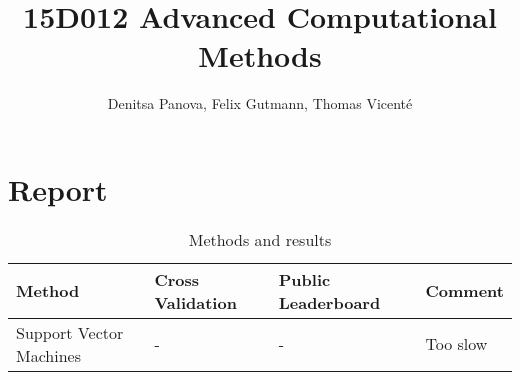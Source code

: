 \documentclass[fleqn]{article}
\title{15D012 Advanced Computational Methods}
\author{Denitsa Panova, Felix Gutmann, Thomas Vicenté}
\date{}
\begin{document}
\maketitle

\section*{Report}

\lipsum[2-4]

\begin{table}[!h]
	\centering
	\caption{Methods and results}
	\vspace{0.3cm}
	\begin{tabular}{|l|l|l|l|}
				\hline
		Method & Cross Validation  & Public Leaderboard & Comment \\
		\hline
		Support Vector Machines & - & - & Too slow 
	\end{tabular}\\
	\vspace{0.3cm}
	\raggedright
	\label{}
\end{table}
\end{document}
